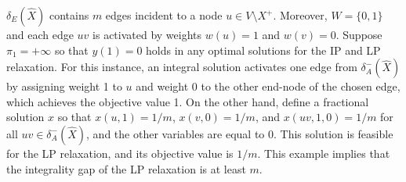 \documentclass[11pt]{article}
\begin{document}
$\delta_E(\hat{X})$ contains
$m$ edges incident to a node $u \in V\setminus X^+$.
Moreover, $W=\{0,1\}$ and each
edge $uv$ is activated by weights $w(u)=1$ and $w(v)=0$.
Suppose $\pi_1=+\infty$ so that $y(1)=0$ holds in any optimal
solutions for the IP and LP relaxation. 
For this instance, an integral solution activates one edge from
$\delta^-_A(\hat{X})$ by assigning weight 1 to $u$ and weight 0 to the
other end-node of the
chosen edge, which achieves the objective value 1.
On the other hand, define a fractional
solution $x$ so that
$x(u,1)=1/m$, $x(v,0)=1/m$,
and $x(uv,1,0)=1/m$
for all $uv \in \delta^-_A(\hat{X})$,
and the other variables are equal to 0.
This solution
is feasible for the LP relaxation,
and its objective value is $1/m$. This example implies that
the integrality gap of the LP relaxation is at least $m$.
\end{document}
